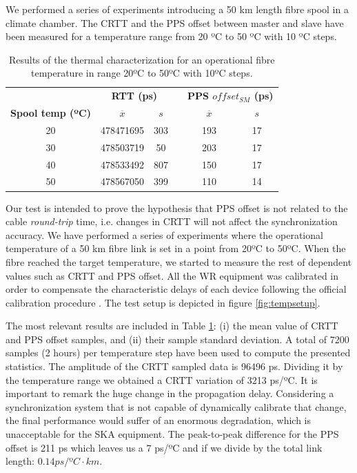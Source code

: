 We performed a series of experiments introducing a 50 km length fibre spool in 
a climate chamber. The CRTT and the PPS offset between master and slave have 
been measured for a temperature range from 20 ºC to 50 ºC with 10 ºC steps. 

\begin{table}\centering
	\begin{tabular}{@{} cccccc@{}}%
		& \multicolumn{2}{c}{\bfseries{RTT (ps)}} & &
		\multicolumn{2}{c}{\bfseries{PPS $offset_{SM}$ (ps)}} \\
		\cmidrule(l){2-3}  \cmidrule{5-6}
		\textbf{Spool temp (ºC)} & $\overline{x}$ & $s$ & & $\overline{x}$ 
		& $s$ \\ \midrule
		\small{20} & 478471695 & 303 & & 193 & 17 \\
		\small{30} & 478503719 & 50  & & 203 & 17 \\
		\small{40} & 478533492 & 807 & & 150 & 17 \\
		\small{50} & 478567050 & 399 & & 110 & 14 \\
		\bottomrule
	\end{tabular}
	\caption{Results of the thermal characterization for an operational fibre 
		temperature in range 20ºC to 50ºC with 10ºC steps.}
	\label{tab:temp}
\end{table}

Our test is intended to prove the hypothesis that PPS offset is not related to 
the cable \textit{round-trip} time, i.e. changes in CRTT will not affect the 
synchronization accuracy. We have performed a series of experiments where the 
operational temperature of a 50 km fibre link is set in a point from 20ºC to 
50ºC. When the fibre reached the target temperature, we started to measure the 
rest of dependent values such as CRTT and PPS offset. All the WR equipment was 
calibrated in order to compensate the characteristic delays of each device 
following the official calibration procedure \cite{man:calib}.  The test setup 
is depicted in figure \ref{fig:tempsetup}.

The most relevant results are included in Table \ref{tab:temp}: (i) the mean 
value of CRTT and PPS offset samples, and (ii) their sample standard deviation. 
A total of 7200 samples (2 hours) per temperature step have been used to 
compute the presented statistics. The amplitude of the CRTT sampled data is 
96496 ps. Dividing it by the temperature range we obtained a CRTT variation of 
3213 ps/ºC. It is important to remark the huge change in the propagation delay. 
Considering a synchronization system that is not capable of dynamically 
calibrate that change, the final performance would suffer of an enormous 
degradation, which is unacceptable for the SKA equipment. The peak-to-peak 
difference for the PPS offset is 211 ps which leaves us a 7 ps/ºC and if we 
divide by the total link length: $0.14 ps/ºC \cdot km$.

